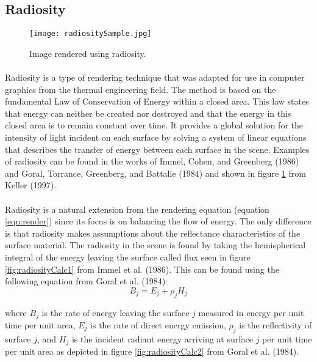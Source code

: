 \subsection{Radiosity}

\begin{figure}[h!]
  \centering
    \texttt{[image: radiositySample.jpg]}
  \caption{Image rendered using radiosity.}
	\label{fig:radiositySample}
\end{figure}

\paragraph{}
Radiosity is a type of rendering technique that was adapted for use in computer graphics from the thermal engineering field.  The method is based on the fundamental Law of Conservation of Energy within a closed area.  This law states that energy can neither be created nor destroyed and that the energy in this closed area is to remain constant over time.  It provides a global solution for the intensity of light incident on each surface by solving a system of linear equations that describes the transfer of energy between each surface in the scene.  Examples of radiosity can be found in the works of Immel, Cohen, and Greenberg (1986) and Goral, Torrance, Greenberg, and Battalie (1984) and shown in figure \ref{fig:radiositySample} from Keller (1997).

\paragraph{}
Radiosity is a natural extension from the rendering equation (equation \ref{eqn:render}) since its focus is on balancing the flow of energy.  The only difference is that radiosity makes assumptions about the reflectance characteristics of the surface material.  The radiosity in the scene is found by taking the hemispherical integral of the energy leaving the surface called flux seen in figure \ref{fig:radiosityCalc1} from Immel et al. (1986).  This can be found using the following equation from Goral et al. (1984):
\begin{equation}
B_{j} = E_{j} + \rho_{j}H_{j} \label{eqn:radiosity1}
\end{equation}

where $B_{j}$ is the rate of energy leaving the surface $j$ measured in energy per unit time per unit area, $E_{j}$ is the rate of direct energy emission,  $\rho_{j}$ is the reflectivity of surface $j$, and $H_{j}$ is the incident radiant energy arriving at surface $j$ per unit time per unit area as depicted in figure \ref{fig:radiosityCalc2} from Goral et al. (1984).

